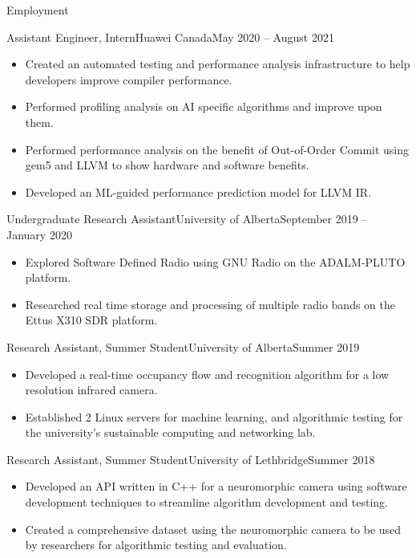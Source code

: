 \documentclass[]{mcdowellcv}
\begin{document}
\begin{cvsection}{Employment}
   \begin{cvsubsection}{Assistant Engineer, Intern}{Huawei Canada}{May 2020 -- August 2021}
    \vspace*{5pt}
    \begin{itemize}
      \item Created an automated testing and performance analysis infrastructure to help developers improve compiler performance.
      \item Performed profiling analysis on AI specific algorithms and improve upon them.
      \item Performed performance analysis on the benefit of Out-of-Order Commit using gem5 and LLVM to show hardware and software benefits.
      \item Developed an ML-guided performance prediction model for LLVM IR.
    \end{itemize}

  \end{cvsubsection}
  
  \begin{cvsubsection}{Undergraduate Research Assistant}{University of Alberta}{September 2019 -- January 2020}
    \vspace*{5pt}
    \begin{itemize}
      \item Explored Software Defined Radio using GNU Radio on the ADALM-PLUTO platform.
      \item Researched real time storage and processing of multiple radio bands on the Ettus X310 SDR platform.
    \end{itemize}

  \end{cvsubsection}
  \begin{cvsubsection}{Research Assistant, Summer Student}{University of Alberta}{Summer 2019}
    \vspace*{5pt}		
    \begin{itemize}
      \item Developed a real-time occupancy flow and recognition algorithm for a low resolution infrared camera.
      \item Established 2 Linux servers for machine learning, and algorithmic testing for the university's sustainable computing and networking lab.
    \end{itemize}
  \end{cvsubsection}
  \begin{cvsubsection}{Research Assistant, Summer Student}{University of Lethbridge}{Summer 2018}	
    \vspace*{5pt}
    \begin{itemize}
      \item Developed an API written in C++ for a neuromorphic camera using software development techniques to streamline algorithm development and testing.
      \item Created a comprehensive dataset using the neuromorphic camera to be used by researchers for algorithmic testing and evaluation.
    \end{itemize}
  \end{cvsubsection}
\end{cvsection}
\end{document}
